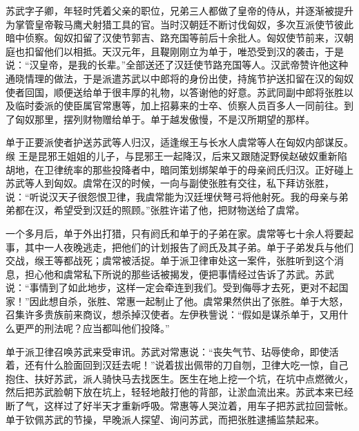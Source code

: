 \documentclass[12pt,UTF-8,openany,a4]{ctexbook}
\begin{document}
\begin{large}\yiwen
    
    苏武字子卿，年轻时凭着父亲的职位，兄弟三人都做了皇帝的侍从，并逐渐被提升为掌管皇帝鞍马鹰犬射猎工具的官。当时汉朝廷不断讨伐匈奴，多次互派使节彼此暗中侦察。匈奴扣留了汉使节郭吉、路充国等前后十余批人。匈奴使节前来，汉朝庭也扣留他们以相抵。天汉元年，且鞮刚刚立为单于，唯恐受到汉的袭击，于是说：“汉皇帝，是我的长辈。”全部送还了汉廷使节路充国等人。汉武帝赞许他这种通晓情理的做法，于是派遣苏武以中郎将的身份出使，持旄节护送扣留在汉的匈奴使者回国，顺便送给单于很丰厚的礼物，以答谢他的好意。苏武同副中郎将张胜以及临时委派的使臣属官常惠等，加上招募来的士卒、侦察人员百多人一同前往。到了匈奴那里，摆列财物赠给单于。单于越发傲慢，不是汉所期望的那样。
    
    单于正要派使者护送苏武等人归汉，适逢缑王与长水人虞常等人在匈奴内部谋反。缑 王是昆邪王姐姐的儿子，与昆邪王一起降汉，后来又跟随浞野侯赵破奴重新陷胡地，在卫律统率的那些投降者中，暗同策划绑架单于的母亲阏氏归汉。正好碰上苏武等人到匈奴。虞常在汉的时候，一向与副使张胜有交往，私下拜访张胜，说：“听说汉天子很怨恨卫律，我虞常能为汉廷埋伏弩弓将他射死。我的母亲与弟弟都在汉，希望受到汉廷的照顾。”张胜许诺了他，把财物送给了虞常。
    
    一个多月后，单于外出打猎，只有阏氏和单于的子弟在家。虞常等七十余人将要起事，其中一人夜晚逃走，把他们的计划报告了阏氏及其子弟。单于子弟发兵与他们交战，缑王等都战死；虞常被活捉。单于派卫律审处这一案件，张胜听到这个消息，担心他和虞常私下所说的那些话被揭发，便把事情经过告诉了苏武。苏武说：“事情到了如此地步，这样一定会牵连到我们。受到侮辱才去死，更对不起国家！”因此想自杀，张胜、常惠一起制止了他。虞常果然供出了张胜。单于大怒，召集许多贵族前来商议，想杀掉汉使者。左伊秩訾说：“假如是谋杀单于，又用什么更严的刑法呢？应当都叫他们投降。”
    
    单于派卫律召唤苏武来受审讯。苏武对常惠说：“丧失气节、玷辱使命，即使活着，还有什么脸面回到汉廷去呢！”说着拔出佩带的刀自刎，卫律大吃一惊，自己抱住、扶好苏武，派人骑快马去找医生。医生在地上挖一个坑，在坑中点燃微火，然后把苏武脸朝下放在坑上，轻轻地敲打他的背部，让淤血流出来。苏武本来已经断了气，这样过了好半天才重新呼吸。常惠等人哭泣着，用车子把苏武拉回营帐。单于钦佩苏武的节操，早晚派人探望、询问苏武，而把张胜逮捕监禁起来。
    

\end{large}
\end{document}
